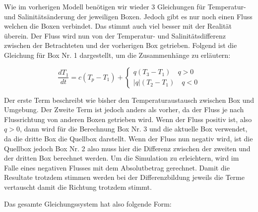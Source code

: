 Wie im vorherigen Modell benötigen wir wieder 3 Gleichungen für Temperatur- und Salinitätsänderung der jeweiligen Boxen.
Jedoch gibt es nur noch einen Fluss welchen die Boxen verbindet. Das stimmt auch viel besser mit der Realität überein. Der Fluss wird nun von der Temperatur- und Salinitätsdifferenz zwischen der Betrachteten und der vorherigen Box getrieben. Folgend ist die Gleichung für Box Nr. 1 dargestellt, um die Zusammenhänge zu erläutern:

\begin{equation}
\frac{dT_1}{dt} = c(T_p-T_1)+ \begin{cases} q(T_3-T_1)  \quad q>0 \\ |q|(T_2-T_1)  \quad q<0 \end{cases}
\end{equation}

Der erste Term beschreibt wie bisher den Temperaturaustausch zwischen Box und Umgebung. Der Zweite Term ist jedoch anders als vorher, da der Fluss je nach Flussrichtung von anderen Boxen getrieben wird. 
Wenn der Fluss positiv ist, also $q>0$, dann wird für die Berechnung Box Nr. 3 und die aktuelle Box verwendet, da die dritte Box die Quellbox darstellt. Wenn der Fluss nun negativ wird, ist die Quellbox jedoch Box Nr. 2 also muss hier die Differenz zwischen der zweiten und der dritten Box berechnet werden. Um die Simulation zu erleichtern, wird im Falle eines negativen Flusses mit dem Absolutbetrag gerechnet. Damit die Resultate trotzdem stimmen werden  bei der Differenzbildung jeweils die Terme vertauscht damit die Richtung trotzdem stimmt. 

Das gesamte Gleichungssystem hat also folgende Form:

